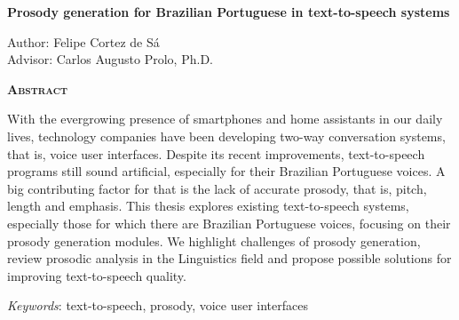 \begin{center}
	{\Large{\textbf{Prosody generation for Brazilian Portuguese in text-to-speech systems}}}
\end{center}

\vspace{1cm}

\begin{flushright}
	Author: Felipe Cortez de Sá \\
	Advisor: Carlos Augusto Prolo, Ph.D.
\end{flushright}

\vspace{1cm}

\begin{center}
	\Large{\textsc{\textbf{Abstract}}}
\end{center}

\noindent With the evergrowing presence of smartphones and home assistants in
our daily lives, technology companies have been developing two-way conversation
systems, that is, voice user interfaces. Despite its recent improvements,
text-to-speech programs still sound artificial, especially for their Brazilian
Portuguese voices. A big contributing factor for that is the lack of accurate
prosody, that is, pitch, length and emphasis. This thesis explores existing
text-to-speech systems, especially those for which there are Brazilian
Portuguese voices, focusing on their prosody generation modules. We highlight
challenges of prosody generation, review prosodic analysis in the Linguistics
field and propose possible solutions for improving text-to-speech quality.


\noindent\textit{Keywords}: text-to-speech, prosody, voice user interfaces
